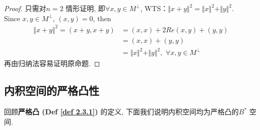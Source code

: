 \begin{defn}
\begin{rmk}
\begin{itemize}
				\begin{proof}
					只需对$n = 2$ 情形证明, 即$\forall x , y \in M^{\perp}$, WTS：$\Vert x + y \Vert^2 = \Vert x \Vert^2 + \Vert y \Vert^2$. \\
					Since $x , y \in M^{\perp}$, $(x , y) = 0$, then
					\begin{align}
						\Vert x + y \Vert^2 
						= (x + y , x + y) 
						&= (x , x) + 2Re(x , y) + (y , y) \\
						&= (x , x) + (y , y) \\
						&= \Vert x \Vert^2 + \Vert y \Vert^2 , \,\, \forall x , y \in M^{\perp}
					\end{align}
					再由归纳法容易证明原命题. 
				\end{proof}
			\end{itemize}
		\end{rmk}
	\end{defn}

\newpage

\subsection{内积空间的严格凸性}
	回顾\textbf{严格凸 (Def \ref{def 2.3.1})} 的定义, 下面我们说明内积空间均为严格凸的$B^*$ 空间. 
	
	\vspace{1em}
	
